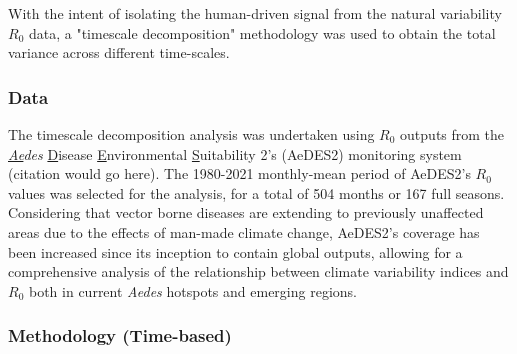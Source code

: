 \documentclass[fleqn,10pt]{wlscirep}
\begin{document}
  With the intent of isolating the human-driven signal from the natural variability $R_0$ data, a "timescale decomposition" methodology was used to obtain the total variance across different time-scales. 

  \subsubsection{Data} \label{sec-methods-1-data}
  The timescale decomposition analysis was undertaken using $R_0$ outputs from the \textit{\underline{Ae}des} \underline{D}isease \underline{E}nvironmental \underline{S}uitability 2's (AeDES2) monitoring system (citation would go here). The 1980-2021 monthly-mean period of AeDES2's $R_0$ values was selected for the analysis, for a total of 504 months or 167 full seasons. Considering that vector borne diseases are extending to previously unaffected areas due to the effects of man-made climate change, AeDES2's coverage has been increased since its inception to contain global outputs, allowing for a comprehensive analysis of the relationship between climate variability indices and $R_0$ both in current \textit{Aedes} hotspots and emerging regions.

  \subsubsection{Methodology (Time-based)} \label{sec-methods-1-methodology}
\end{document}
